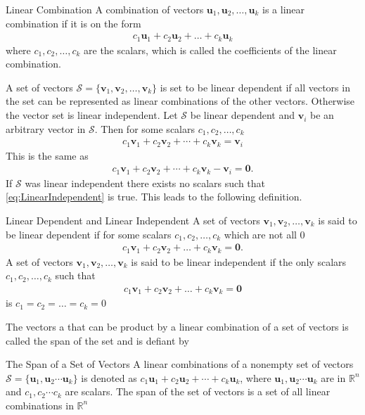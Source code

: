 \begin{definition}{Linear Combination}
    A combination of vectors $\textbf{u}_1, \textbf{u}_2, \hdots, \textbf{u}_k$ is a linear combination if it is on the form
    \begin{align*}
        c_1\textbf{u}_1 + c_2\textbf{u}_2 + \hdots + c_k\textbf{u}_k
    \end{align*}
    where $c_1, c_2, \hdots, c_k$ are the scalars, which is called the coefficients of the linear combination. 
\end{definition}
 A set of vectors $\mathcal{S}=\{\textbf{v}_1, \textbf{v}_2, \hdots, \textbf{v}_k\}$ is set to be linear dependent if all vectors in the set can be represented as linear combinations of the other vectors. Otherwise the vector set is linear independent.
 Let $\mathcal{S}$ be linear dependent and $\textbf{v}_i$ be an arbitrary vector in $\mathcal{S}$. Then for some scalars $c_1, c_2, \hdots, c_k$
 \begin{align} \label{eq:LinearIndependent}
    c_1\textbf{v}_1+c_2\textbf{v}_2+\cdots+c_k\textbf{v}_k=\textbf{v}_i
 \end{align}
 This is the same as
  \begin{align*}
    c_1\textbf{v}_1+c_2\textbf{v}_2+\cdots+c_k\textbf{v}_k-\textbf{v}_i=\textbf{0}.
 \end{align*}
 If $\mathcal{S}$ was linear independent there exists no scalars such that \eqref{eq:LinearIndependent} is true. This leads to the following definition.
\begin{definition}{Linear Dependent and Linear Independent}
    A set of vectors $\textbf{v}_1, \textbf{v}_2, \hdots, \textbf{v}_k$ is said to be linear dependent if for some scalars $c_1, c_2, \hdots, c_k$ which are not all $0$
    \begin{align*}
       c_1\textbf{v}_1+c_2\textbf{v}_2+\dots+c_k\textbf{v}_k=\textbf{0}.
    \end{align*}
    A set of vectors $\textbf{v}_1, \textbf{v}_2, \hdots, \textbf{v}_k$ is said to be linear independent if the only scalars $c_1, c_2, \hdots, c_k$ such that
    \begin{align*}
        c_1\textbf{v}_1+c_2\textbf{v}_2+\dots+c_k\textbf{v}_k=\textbf{0}
    \end{align*}
    is $c_1=c_2=\hdots=c_k=0$
\end{definition}
\noindent The vectors a that can be product by a linear combination of a set of vectors is called the span of the set and is defiant by
\begin{definition} {The Span of a Set of Vectors}
A linear combinations of a nonempty set of vectors $\mathcal{S} = \{ \textbf{u}_1,\textbf{u}_2 \cdots \textbf{u}_k\}$ is denoted as $c_1 \textbf{u}_1 + c_2\textbf{u}_2+ \cdots+ c_k\textbf{u}_k$, where $\textbf{u}_1,\textbf{u}_2 \cdots \textbf{u}_k$ are in $\mathbb{R}^n$ and $c_1, c_2 \cdots c_k$ are scalars.
The span of the set of vectors is a set of all linear combinations in $\mathbb{R}^n$
\cite[66]{LiAl}
\end{definition}

